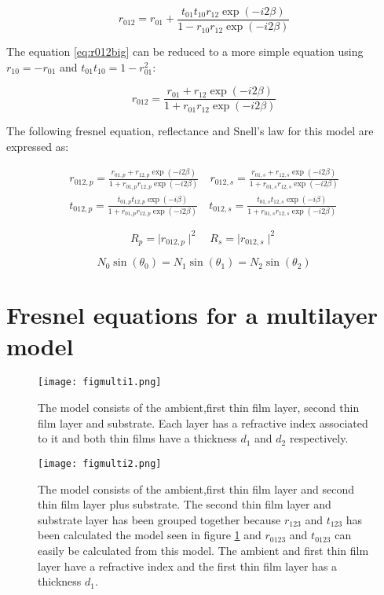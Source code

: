\documentclass[MasterThesisMain.tex]{subfiles}
\begin{document}
\begin{equation} \label{eq:r012big}
r_{012}=r_{01}+\frac{t_{01}t_{10}r_{12}\exp(-i2\beta)}{1-r_{10}r_{12}\exp(-i2\beta)}
\end{equation}

The equation \ref{eq:r012big} can be reduced to a more simple equation using $r_{10}=-r_{01}$ and $t_{01}t_{10}=1-r_{01}^2$:

\begin{equation}\label{eq:2layerreflect}
r_{012}= \frac{r_{01}+r_{12}\exp(-i2\beta)}{1+r_{01}r_{12}\exp(-i2\beta)}
\end{equation} 

The following fresnel equation, reflectance and Snell's law for this model are expressed as:

\begin{align}
r_{012,p} = \frac{r_{01,p}+r_{12,p}\exp(-i2\beta)}{1+r_{01,p}r_{12,p}\exp(-i2\beta)} \quad r_{012,s}= \frac{r_{01,s}+r_{12,s}\exp(-i2\beta)}{1+r_{01,s}r_{12,s}\exp(-i2\beta)}\\
t_{012,p} = \frac{t_{01,p}t_{12,p}\exp(-i\beta)}{1+r_{01,p}r_{12,p}\exp(-i2\beta)} \quad t_{012,s} = \frac{t_{01,s}t_{12,s}\exp(-i\beta)}{1+r_{01,s}r_{12,s}\exp(-i2\beta)} \label{eq:2layertrans}
\end{align}

\begin{equation}
R_p=\mid r_{012,p} \mid^2 \quad R_s=\mid r_{012,s} \mid^2
\end{equation}

\begin{equation}
N_0\sin(\theta_0)=N_1\sin(\theta_1)=N_2\sin(\theta_2)
\end{equation} 

\section{Fresnel equations for a multilayer model} 

\begin{figure}
\centering
\texttt{[image: figmulti1.png]}
\caption{The model consists of the ambient,first thin film layer, second thin film layer and substrate. Each layer has a refractive index associated to it and both thin films have a thickness $d_1$ and $d_2$ respectively.}
\label{fig:multilayer1}
\end{figure}

\begin{figure}
\centering
\texttt{[image: figmulti2.png]}
\caption{The model consists of the ambient,first thin film layer and second thin film layer plus substrate. The second thin film layer and substrate layer has been grouped together because $r_{123}$ and $t_{123}$ has been calculated the model seen in figure \ref{fig:multilayer1} and $r_{0123}$ and $t_{0123}$ can easily be calculated from this model. The ambient and first thin film layer have a refractive index and the first thin film layer has a thickness $d_1$.}
\label{fig:multilayer2}
\end{figure}
\end{document}
